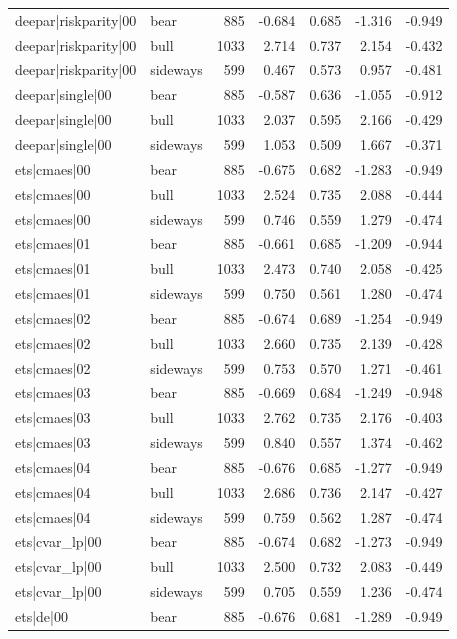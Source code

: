 \begin{table}
\begin{tabular}{llrrrrr}
deepar|riskparity|00 & bear & 885 & -0.684 & 0.685 & -1.316 & -0.949 \\
deepar|riskparity|00 & bull & 1033 & 2.714 & 0.737 & 2.154 & -0.432 \\
deepar|riskparity|00 & sideways & 599 & 0.467 & 0.573 & 0.957 & -0.481 \\
deepar|single|00 & bear & 885 & -0.587 & 0.636 & -1.055 & -0.912 \\
deepar|single|00 & bull & 1033 & 2.037 & 0.595 & 2.166 & -0.429 \\
deepar|single|00 & sideways & 599 & 1.053 & 0.509 & 1.667 & -0.371 \\
ets|cmaes|00 & bear & 885 & -0.675 & 0.682 & -1.283 & -0.949 \\
ets|cmaes|00 & bull & 1033 & 2.524 & 0.735 & 2.088 & -0.444 \\
ets|cmaes|00 & sideways & 599 & 0.746 & 0.559 & 1.279 & -0.474 \\
ets|cmaes|01 & bear & 885 & -0.661 & 0.685 & -1.209 & -0.944 \\
ets|cmaes|01 & bull & 1033 & 2.473 & 0.740 & 2.058 & -0.425 \\
ets|cmaes|01 & sideways & 599 & 0.750 & 0.561 & 1.280 & -0.474 \\
ets|cmaes|02 & bear & 885 & -0.674 & 0.689 & -1.254 & -0.949 \\
ets|cmaes|02 & bull & 1033 & 2.660 & 0.735 & 2.139 & -0.428 \\
ets|cmaes|02 & sideways & 599 & 0.753 & 0.570 & 1.271 & -0.461 \\
ets|cmaes|03 & bear & 885 & -0.669 & 0.684 & -1.249 & -0.948 \\
ets|cmaes|03 & bull & 1033 & 2.762 & 0.735 & 2.176 & -0.403 \\
ets|cmaes|03 & sideways & 599 & 0.840 & 0.557 & 1.374 & -0.462 \\
ets|cmaes|04 & bear & 885 & -0.676 & 0.685 & -1.277 & -0.949 \\
ets|cmaes|04 & bull & 1033 & 2.686 & 0.736 & 2.147 & -0.427 \\
ets|cmaes|04 & sideways & 599 & 0.759 & 0.562 & 1.287 & -0.474 \\
ets|cvar\_lp|00 & bear & 885 & -0.674 & 0.682 & -1.273 & -0.949 \\
ets|cvar\_lp|00 & bull & 1033 & 2.500 & 0.732 & 2.083 & -0.449 \\
ets|cvar\_lp|00 & sideways & 599 & 0.705 & 0.559 & 1.236 & -0.474 \\
ets|de|00 & bear & 885 & -0.676 & 0.681 & -1.289 & -0.949 \\

\end{tabular}
\end{table}
